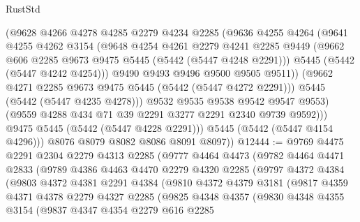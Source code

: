 \begin{lexlean}{RustStd}
\begin{coremodule}
{\begin{coremodule}
{{{{{{{{{{{{                  (@9628
                    @4266
                    @4278
                    @4285
                    @2279
                    @4234
                    @2285
                    (@9636
                      @4255
                      @4264
                      (@9641
                        @4255
                        @4262
                        @3154
                        (@9648
                          @4254
                          @4261
                          @2279
                          @4241
                          @2285
                          @9449
                          (@9662 @606 @2285 @9673 @9475 @5445 (@5442 (@5447 @4248 @2291)))
                          @5445
                          (@5442 (@5447 @4242 @4254)))
                        @9490
                        @9493
                        @9496
                        @9500
                        @9505
                        @9511))
                    (@9662 @4271 @2285 @9673 @9475 @5445 (@5442 (@5447 @4272 @2291)))
                    @5445
                    (@5442 (@5447 @4235 @4278)))
                  @9532
                  @9535
                  @9538
                  @9542
                  @9547
                  @9553)
                (@9559 @4288 @434 @71 @39 @2291 @3277 @2291 @2340 @9739 @9592)))
            @9475
            @5445
            (@5442 (@5447 @4228 @2291)))
          @5445
          (@5442 (@5447 @4154 @4296)))
        @8076
        @8079
        @8082
        @8086
        @8091
        @8097))
@12444 := @9769
    @4475
    @2291
    @2304
    @2279
    @4313
    @2285
    (@9777
      @4464
      @4473
      (@9782
        @4464
        @4471
        @2833
        (@9789
          @4386
          @4463
          @4470
          @2279
          @4320
          @2285
          (@9797
            @4372
            @4384
            (@9803
              @4372
              @4381
              @2291
              @4384
              (@9810
                @4372
                @4379
                @3181
                (@9817
                  @4359
                  @4371
                  @4378
                  @2279
                  @4327
                  @2285
                  (@9825
                    @4348
                    @4357
                    (@9830
                      @4348
                      @4355
                      @3154
                      (@9837
                        @4347
                        @4354
                        @2279
                        @616
                        @2285
}}}}}}}}}}}}
\end{coremodule}}
\end{coremodule}
\end{lexlean}
